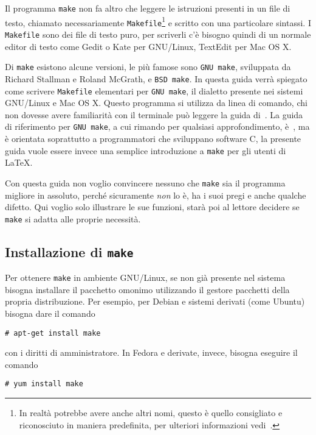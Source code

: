 Il programma \texttt{make} non fa altro che leggere le istruzioni presenti in un
file di testo, chiamato necessariamente
\texttt{Makefile}\footnote{In realtà potrebbe avere anche altri nomi, questo è
  quello consigliato e riconosciuto in maniera predefinita, per ulteriori
  informazioni vedi~\textcite[12]{gnu:make}.}
e scritto con una particolare sintassi.  I \texttt{Makefile} sono dei file di
testo puro, per scriverli c'è bisogno quindi di un normale editor di testo come
Gedit o Kate per GNU/Linux, TextEdit per Mac OS X.

Di \texttt{make} esistono alcune versioni, le più famose sono \texttt{GNU make},
sviluppata da Richard Stallman e Roland McGrath, e \texttt{BSD make}.  In questa
guida verrà spiegato come scrivere \texttt{Makefile} elementari per
\texttt{GNU make}, il dialetto presente nei sistemi GNU/Linux e Mac OS X.
Questo programma si utilizza da linea di comando, chi non dovesse avere
familiarità con il terminale può leggere la guida
di~\textcite{giacomelli:console}.  La guida di riferimento per
\texttt{GNU make}, a cui rimando per qualsiasi approfondimento,
è~\textcite{gnu:make}, ma è orientata soprattutto a programmatori che sviluppano
software C, la presente guida vuole essere invece una semplice introduzione a
\texttt{make} per gli utenti di \LaTeX{}.

Con questa guida non voglio convincere nessuno che \texttt{make} sia il
programma migliore in assoluto, perché sicuramente \emph{non} lo è, ha i suoi
pregi e anche qualche difetto.  Qui voglio solo illustrare le sue funzioni,
starà poi al lettore decidere se \texttt{make} si adatta alle proprie necessità.

\subsection{Installazione di \texttt{make}}
\label{sec:installazione}

Per ottenere \texttt{make} in ambiente GNU/Linux, se non già presente nel
sistema bisogna installare il pacchetto omonimo utilizzando il gestore pacchetti
della propria distribuzione.  Per esempio, per Debian e sistemi derivati (come
Ubuntu) bisogna dare il comando
\begin{verbatim}
# apt-get install make
\end{verbatim}
con i diritti di amministratore.  In Fedora e derivate, invece, bisogna eseguire
il comando
\begin{verbatim}
# yum install make
\end{verbatim}

